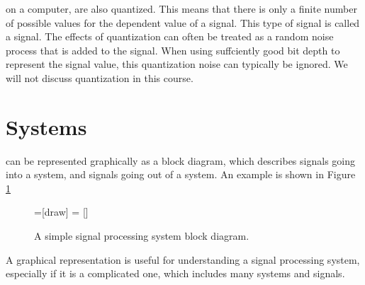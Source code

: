  on a computer, are also quantized. 
This means that there is only a finite number of possible values for
the dependent value of a signal.  This type of signal is called
a \emph{} signal. The effects of
quantization can often be treated as a random noise process that is
added to the signal. When using suffciently good bit depth to
represent the signal value, this quantization noise can typically be
ignored. We will not discuss quantization in this course.


\section{Systems}

 can be represented graphically 
as a block diagram, which describes signals going into a system, and signals going out of a system.
An example is shown in Figure \ref{simple_sps}

\begin{figure}
   =[draw]
    = []

   \begin{center}
   \end{center}
   \label{simple_sps}
   \caption{A simple signal processing system block diagram.}
\end{figure}
A graphical representation is useful for understanding a signal processing system, 
especially if it is a complicated one, which includes many systems and signals.

